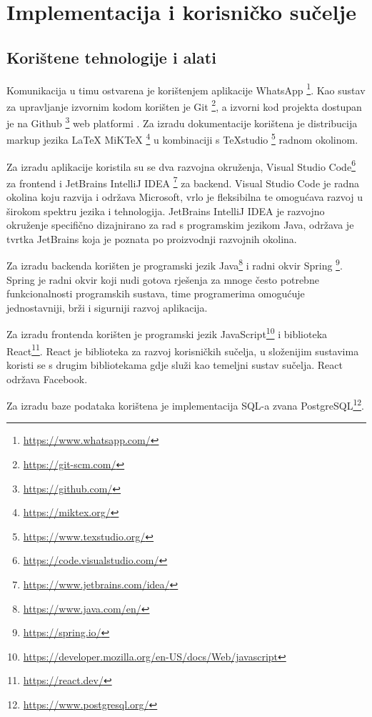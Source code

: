 \chapter{Implementacija i korisničko sučelje}
		
		
		\section{Korištene tehnologije i alati}
		
		
			Komunikacija u timu ostvarena je korištenjem aplikacije WhatsApp \footnote{\url{https://www.whatsapp.com/}}. Kao sustav za upravljanje izvornim kodom korišten je Git \footnote{\url{https://git-scm.com/}}, a izvorni kod projekta dostupan je na Github \footnote{\url{https://github.com/}} web platformi . Za izradu dokumentacije korištena je distribucija markup jezika LaTeX MiKTeX \footnote{\url{https://miktex.org/}}  u kombinaciji s TeXstudio \footnote{\url{https://www.texstudio.org/}} radnom okolinom.
				
			Za izradu aplikacije koristila su se dva razvojna okruženja, Visual Studio Code\footnote{\url{https://code.visualstudio.com/}} za frontend i JetBrains IntelliJ IDEA \footnote{\url{https://www.jetbrains.com/idea/}} za backend. Visual Studio Code je radna okolina koju razvija i održava Microsoft, vrlo je fleksibilna te omogućava razvoj u širokom spektru jezika i tehnologija. JetBrains IntelliJ IDEA je razvojno okruženje specifično dizajnirano za rad s programskim jezikom Java, održava je tvrtka JetBrains koja je poznata po proizvodnji razvojnih okolina.
			
			Za izradu backenda korišten je programski jezik Java\footnote{\url{https://www.java.com/en/}} i radni okvir Spring \footnote{\url{https://spring.io/}}. Spring je radni okvir koji nudi gotova rješenja za mnoge često potrebne funkcionalnosti programskih sustava, time programerima omogućuje jednostavniji, brži i sigurniji razvoj aplikacija. 
			
			Za izradu frontenda korišten je programski jezik JavaScript\footnote{\url{https://developer.mozilla.org/en-US/docs/Web/javascript}} i biblioteka React\footnote{\url{https://react.dev/}}. React je biblioteka za razvoj korisničkih sučelja, u složenijim sustavima koristi se s drugim bibliotekama gdje služi kao temeljni sustav sučelja. React održava Facebook.
			
			Za izradu baze podataka korištena je implementacija SQL-a zvana PostgreSQL\footnote{\url{https://www.postgresql.org/}}. 
			

